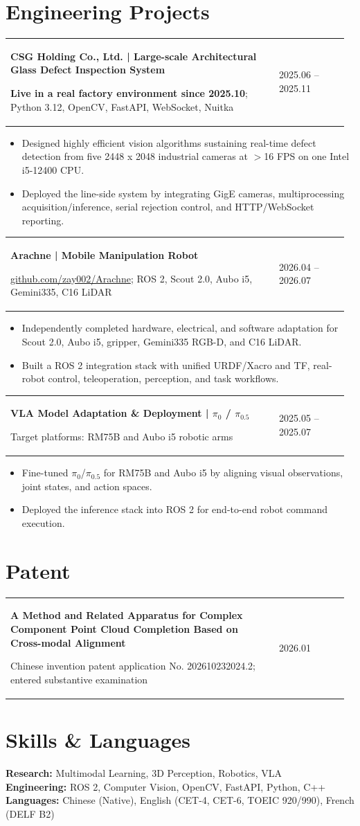 \documentclass[a4paper,10pt]{article}
\makeatletter
\newcommand{\cvEntry}[3]{%
  \begingroup\renewcommand{\arraystretch}{0.78}%
  \noindent\begin{tabular*}{\linewidth}{@{}p{0.77\linewidth}@{\extracolsep{\fill}}p{0.20\linewidth}@{}}
    {\RaggedRight\textbf{#1}\par{\small #2}} & {\raggedleft\small #3\par} \\
  \end{tabular*}\endgroup\vspace{0pt}
}
\makeatother
\begin{document}
\section{Engineering Projects}
\cvEntry{CSG Holding Co., Ltd. | Large-scale Architectural Glass Defect Inspection System}{\textbf{Live in a real factory environment since 2025.10}; Python 3.12, OpenCV, FastAPI, WebSocket, Nuitka}{2025.06 -- 2025.11}
\begin{itemize}
  \item Designed highly efficient vision algorithms sustaining real-time defect detection from five 2448 x 2048 industrial cameras at $>$16 FPS on one Intel i5-12400 CPU.
  \item Deployed the line-side system by integrating GigE cameras, multiprocessing acquisition/inference, serial rejection control, and HTTP/WebSocket reporting.
\end{itemize}
\cvEntry{Arachne | Mobile Manipulation Robot}{\href{https://github.com/zay002/Arachne}{github.com/zay002/Arachne}; ROS 2, Scout 2.0, Aubo i5, Gemini335, C16 LiDAR}{2026.04 -- 2026.07}
\begin{itemize}
  \item Independently completed hardware, electrical, and software adaptation for Scout 2.0, Aubo i5, gripper, Gemini335 RGB-D, and C16 LiDAR.
  \item Built a ROS 2 integration stack with unified URDF/Xacro and TF, real-robot control, teleoperation, perception, and task workflows.
\end{itemize}
\cvEntry{VLA Model Adaptation \& Deployment | \(\pi_0\) / \(\pi_{0.5}\)}{Target platforms: RM75B and Aubo i5 robotic arms}{2025.05 -- 2025.07}
\begin{itemize}
  \item Fine-tuned \(\pi_0\)/\(\pi_{0.5}\) for RM75B and Aubo i5 by aligning visual observations, joint states, and action spaces.
  \item Deployed the inference stack into ROS 2 for end-to-end robot command execution.
\end{itemize}

\section{Patent}
\cvEntry{A Method and Related Apparatus for Complex Component Point Cloud Completion Based on Cross-modal Alignment}{Chinese invention patent application No. 202610232024.2; entered substantive examination}{2026.01}

\section{Skills \& Languages}
\textbf{Research:} Multimodal Learning, 3D Perception, Robotics, VLA\\
\textbf{Engineering:} ROS 2, Computer Vision, OpenCV, FastAPI, Python, C++\\
\textbf{Languages:} Chinese (Native), English (CET-4, CET-6, TOEIC 920/990), French (DELF B2)
\end{document}
